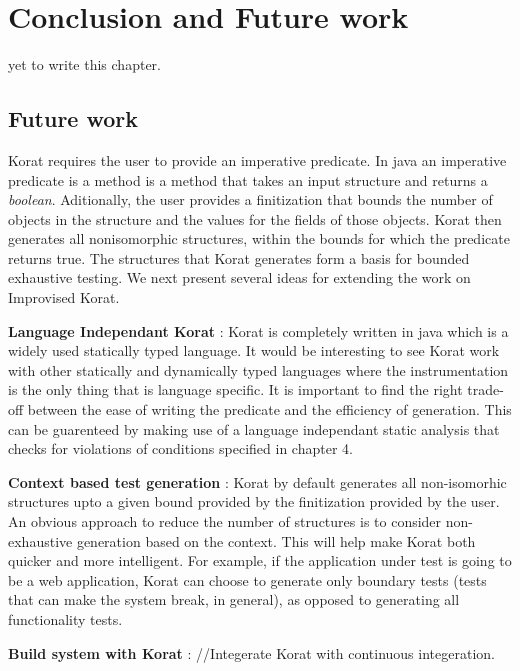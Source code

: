 \chapter{Conclusion and Future work}
yet to write this chapter.

\section{Future work}

Korat requires the user to provide an imperative predicate. In java an imperative predicate is a method is a method that takes an input structure and returns a \emph{boolean}. Aditionally, the user provides a finitization that bounds the number of objects in the structure and the values for the fields of those objects. Korat then generates all nonisomorphic structures, within the bounds for which the predicate returns true. The structures that Korat generates form a basis for bounded exhaustive testing. We next present several ideas for extending the work on Improvised Korat.

\para
\textbf{Language Independant Korat} : Korat is completely written in java which is a widely used statically typed language. It would be interesting to see Korat work with other statically and dynamically typed languages where the instrumentation is the only thing that is language specific. It is important to find the right trade-off between the ease of writing the predicate and the efficiency of generation. This can be guarenteed by making use of a language independant static analysis that checks for violations of conditions specified in chapter 4.

\para
\textbf{Context based test generation} : Korat by default generates all non-isomorhic structures upto a given bound provided by the finitization provided by the user. An obvious approach to reduce the number of structures is to consider non-exhaustive generation based on the context. This will help make Korat both quicker and more intelligent. For example, if the application under test is going to be a web application, Korat can choose to generate only boundary tests (tests that can make the system break, in general), as opposed to generating all functionality tests.

\para
\textbf{Build system with Korat} : //Integerate Korat with continuous integeration.


